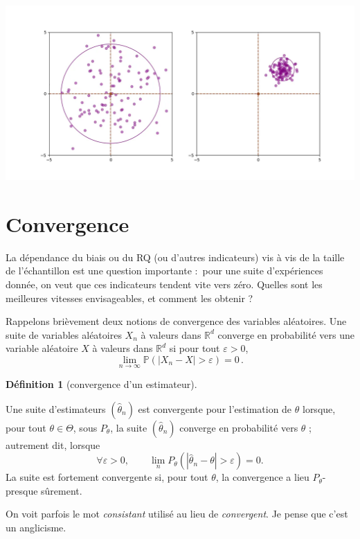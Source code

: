\documentclass[
  10,
  letterpaper,
  DIV=11,
  numbers=noendperiod]{scrreport}
\theoremstyle{plain}
\theoremstyle{definition}
\theoremstyle{plain}
\theoremstyle{definition}
\newtheorem{definition}{Définition}[chapter]
\theoremstyle{definition}
\theoremstyle{plain}
\theoremstyle{remark}
\begin{document}
\includegraphics{images/bias-variance.webp}

\hypertarget{convergence}{%
\section{Convergence}\label{convergence}}

La dépendance du biais ou du RQ (ou d'autres indicateurs) vis à vis de
la taille de l'échantillon est une question importante :~pour une suite
d'expériences donnée, on veut que ces indicateurs tendent vite vers
zéro. Quelles sont les meilleures vitesses envisageables, et comment les
obtenir ?

Rappelons brièvement deux notions de convergence des variables
aléatoires. Une suite de variables aléatoires \(X_n\) à valeurs dans
\(\mathbb{R}^d\) converge en probabilité vers une variable aléatoire
\(X\) à valeurs dans \(\mathbb{R}^d\) si pour tout \(\varepsilon >0\),
\[
\lim_{n\to\infty} \mathbb{P} (| X_n -X|> \varepsilon ) = 0 \, .
\]

\begin{definition}[convergence d'un
estimateur]\protect\hypertarget{def-consistance}{}\label{def-consistance}

Une suite d'estimateurs \((\widehat{\theta}_n)\) est convergente pour
l'estimation de \(\theta\) lorsque, pour tout \(\theta \in \Theta\),
sous \(P_\theta\), la suite \((\hat{\theta}_n)\) converge en probabilité
vers \(\theta\) ; autrement dit, lorsque
\[ \forall \varepsilon>0, \qquad \lim_n     P_\theta ( | \widehat{\theta}_n-\theta| > \varepsilon ) =0.
\] La suite est fortement convergente si, pour tout \(\theta\), la
convergence a lieu \(P_\theta\)-presque sûrement.

\end{definition}

On voit parfois le mot \emph{consistant} utilisé au lieu de
\emph{convergent}. Je pense que c'est un anglicisme.
\end{document}
